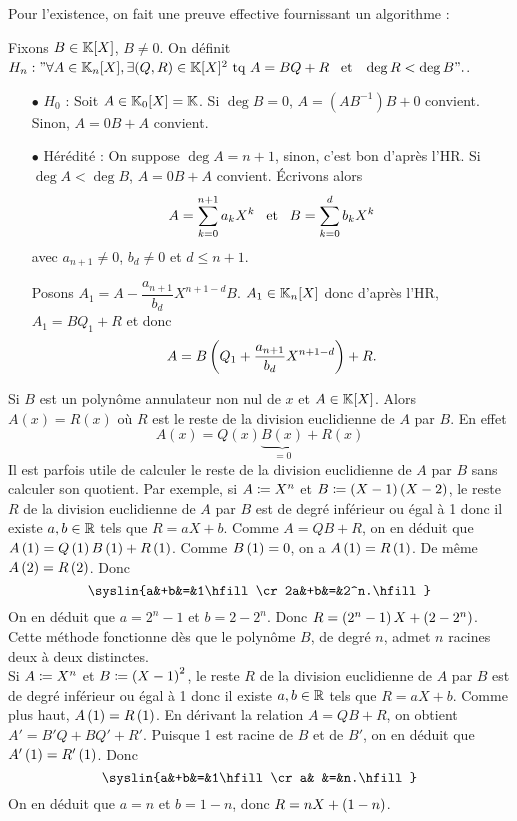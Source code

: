 \documentclass{magnolia}
\begin{document}
  \begin{preuve}
  Pour l'existence, on fait une preuve effective fournissant un algorithme :
  
  Fixons $B\in \polyK$, $B\neq 0$. On définit $H_n : " \forall A \in \polyK[n], \exists (Q,R)\in \polyK^2 \text{ tq } A=BQ+R \et \deg R<\deg B".$.
  \begin{itemize}
  \item[$\bullet$] $H_0$ : Soit $A\in \polyK[0]=\K$. Si $\deg B=0$, $A=(AB^{-1})B+0$ convient. Sinon, $A=0B+A$ convient.
  \item[$\bullet$] Hérédité : On suppose $\deg A=n+1$, sinon, c'est bon d'après l'HR. Si $\deg A<\deg B$, $A=0B+A$ convient.
  \'Ecrivons alors $$A=\sum_{k=0}^{n+1}a_k X^k \quad\!\text{et}\quad\! B=\sum_{k=0}^{d}b_k X^k$$ avec $a_{n+1}\neq 0$, $b_d\neq 0$ et $d\leq n+1$.
  
  Posons $A_1=A-\dfrac{a_{n+1}}{b_d}X^{n+1-d}B$. $A_1\in \polyK[n]$ donc d'après l'HR, $A_1=BQ_1+R$ et donc $$A=B\left(Q_1+\dfrac{a_{n+1}}{b_d}X^{n+1-d}\right)+R.$$
  \end{itemize}
  \end{preuve}
  
  \begin{remarques}
  \remarque Si $B$ est un polynôme annulateur non nul de $x$ et $A\in\polyK$.
    Alors $A(x)=R(x)$ où $R$ est le reste de la division euclidienne de $A$
    par $B$. En effet
    \[A(x)=Q(x)\underbrace{B(x)}_{=0}+R(x)\]
  \exo Il est parfois utile de calculer le reste de la division euclidienne
    de $A$ par $B$ sans calculer son quotient.
      Par exemple, si $A\coloneqq X^n$
      et $B\coloneqq \left(X-1\right)\left(X-2\right)$, le reste $R$ de la division euclidienne de $A$ par $B$
      est de degré inférieur ou égal à 1 donc il existe $a,b\in\mathbb{R}$ tels que
      $R=aX+b$. Comme $A=QB+R$, on en déduit que
      $A\left(1\right)=Q\left(1\right)B\left(1\right)+R\left(1\right)$. Comme $B\left(1\right)=0$, on a $A\left(1\right)=R\left(1\right)$. De
      même $A\left(2\right)=R\left(2\right)$. Donc
      \[\syslin{a&+b&=&1\hfill\cr
               2a&+b&=&2^n.\hfill}\]
      On en déduit que $a=2^n-1$ et $b=2-2^n$. Donc $R=\left(2^n-1\right)X+\left(2-2^n\right)$.
      Cette méthode fonctionne dès que le polynôme $B$, de degré $n$, admet $n$
      racines deux à deux distinctes.\\
      Si $A\coloneqq X^n$
      et $B\coloneqq \left(X-1\right)^2$, le reste $R$ de la division euclidienne de $A$ par $B$
      est de degré inférieur ou égal à 1 donc il existe $a,b\in\mathbb{R}$ tels que
      $R=aX+b$. Comme plus haut, $A\left(1\right)=R\left(1\right)$. En dérivant la relation
      $A=QB+R$, on obtient $A'=B'Q+BQ'+R'$. Puisque 1 est racine de $B$ et de $B'$, on
      en déduit que $A'\left(1\right)=R'\left(1\right)$. Donc
      \[\syslin{a&+b&=&1\hfill\cr
                a&  &=&n.\hfill}\]
      On en déduit que $a=n$ et $b=1-n$, donc $R=nX+\left(1-n\right)$.
  \end{remarques}
  
\end{document}
